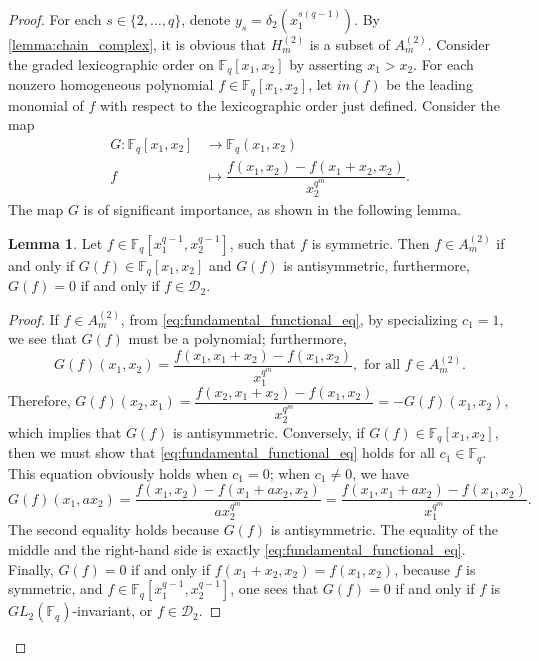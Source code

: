 \documentclass[12pt,a4paper]{report}
\theoremstyle{definition}
\newtheorem{lemma}[theorem]{Lemma}
\theoremstyle{remark}
\theoremstyle{definition}
\begin{document}
\begin{proof}
    For each $s\in \{2, \ldots, q\}$, denote $y_s = \delta_2(x_1^{s(q-1)})$. By \cref{lemma:chain_complex}, it is obvious that $H_m^{(2)}$ is a subset of $A_m^{(2)}$. \smallbreak
    Consider the graded lexicographic order on $\mathbb{F}_q[x_1, x_2]$ by asserting $x_1>x_2$. For each nonzero homogeneous polynomial $f\in \mathbb{F}_q[x_1, x_2]$, let $in(f)$ be the leading monomial of $f$ with respect to the lexicographic order just defined. Consider the map
    \begin{align*}
        G: \mathbb{F}_q[x_1, x_2]&\to \mathbb{F}_q(x_1, x_2)\\ 
            f&\mapsto \dfrac{f(x_1, x_2) - f(x_1+x_2, x_2)}{x_2^{q^m}}.
    \end{align*}
    The map $G$ is of significant importance, as shown in the following lemma.
    \begin{lemma}\label{lemma:crucial_prop}
    Let $f\in \mathbb{F}_q[x_1^{q-1}, x_2^{q-1}]$, such that $f$ is symmetric. Then $f\in A_m^{(2)}$ if and only if $G(f)\in \mathbb{F}_q[x_1, x_2]$ and $G(f)$ is antisymmetric, furthermore, $G(f) = 0$ if and only if $f\in \mathcal{D}_2$. 
\end{lemma}
\begin{proof}
    If $f\in A_{m}^{(2)}$, from \eqref{eq:fundamental_functional_eq}, by specializing $c_1=1$, we see that $G(f)$ must be a polynomial; furthermore,
    \begin{equation*}
        G(f)(x_1, x_2) = \dfrac{f(x_1, x_1+x_2) - f(x_1, x_2)}{x_1^{q^m}}, \text{ for all } f\in A_m^{(2)}.
    \end{equation*}
    Therefore, $G(f)(x_2, x_1) = \dfrac{f(x_2, x_1+x_2) - f(x_1, x_2)}{x_2^{q^m}} = -G(f)(x_1, x_2)$, which implies that $G(f)$ is antisymmetric. Conversely, if $G(f)\in \mathbb{F}_q[x_1, x_2]$, then we must show that \eqref{eq:fundamental_functional_eq} holds for all $c_1\in \mathbb{F}_q$. This equation obviously holds when $c_1=0$; when $c_1\neq 0$, we have 
    \begin{equation*}
        G(f)(x_1, ax_2) = \dfrac{f(x_1, x_2) - f(x_1 + ax_2, x_2)}{ax_2^{q^m}} = \dfrac{f(x_1, x_1+ax_2) - f(x_1, x_2)}{x_1^{q^m}}.
    \end{equation*}
    The second equality holds because $G(f)$ is antisymmetric. The equality of the middle and the right-hand side is exactly \eqref{eq:fundamental_functional_eq}. Finally, $G(f) = 0$ if and only if $f(x_1+x_2, x_2) = f(x_1, x_2)$, because $f$ is symmetric, and $f\in \mathbb{F}_q[x_1^{q-1}, x_2^{q-1}]$, one sees that $G(f) = 0$ if and only if $f$ is $GL_2(\mathbb{F}_q)$-invariant, or $f\in \mathcal{D}_2$.

\end{proof}
\end{proof}
\end{document}
